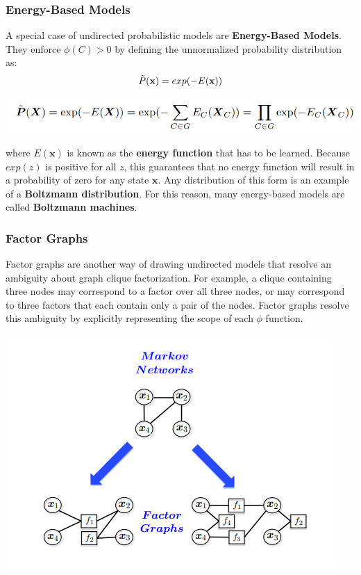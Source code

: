 \subsubsection{Energy-Based Models}
A special case of undirected probabilistic models are \textbf{Energy-Based Models}. They enforce $\phi(C) > 0$ by defining the unnormalized probability distribution as:
\[\Tilde{P}(\textbf{x}) = exp(-E(\textbf{x}))\]
\begin{center}
    \includegraphics[scale=0.7]{images/undirected2.png}
\end{center}
where $E(\textbf{x})$ is known as the \textbf{energy function} that has to be learned.\newline\newline
Because $exp(z)$ is positive for all $z$, this guarantees that no energy function will result in a probability of zero for any state $\textbf{x}$.\newline\newline
Any distribution of this form is an example of a \textbf{Boltzmann distribution}. For this reason, many energy-based models are called
\textbf{Boltzmann machines}.

\subsubsection{Factor Graphs}
Factor graphs are another way of drawing undirected models that resolve an
ambiguity about graph clique factorization. For example, a clique containing three nodes may correspond to a factor over all three nodes, or may correspond to three factors that each contain only a pair of the nodes.\newline\newline
Factor graphs resolve this ambiguity by explicitly representing the scope of each $\phi$ function.
\begin{center}
    \includegraphics[]{images/factor graphs.png}
\end{center}

